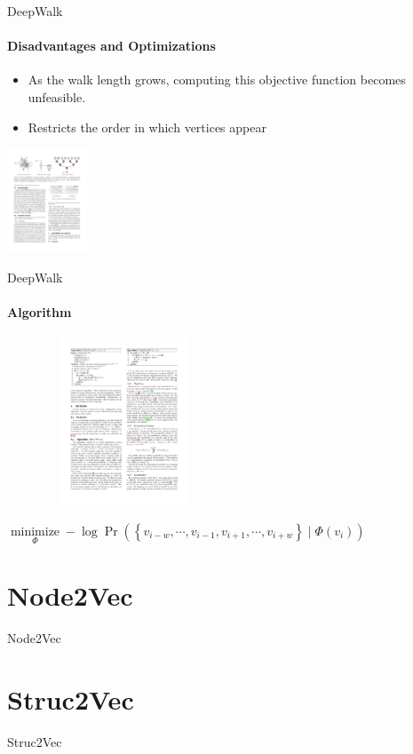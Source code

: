 \documentclass{beamer}
\begin{document}
\begin{frame}{DeepWalk}
    \framesubtitle{Disadvantages and Optimizations}
    \begin{itemize}
        \item As the walk length grows, computing this objective function becomes unfeasible.
        \item Restricts the order in which vertices appear
    \end{itemize}
    \centering\includegraphics[height=3.1cm]{DeepWalk_3.pdf}
\end{frame}
\begin{frame}{DeepWalk}
    \framesubtitle{Algorithm}
    \centering\includegraphics[height=5cm, width=7cm]{DeepWalk_4.pdf}
    \begin{corollary}
        $\underset{\Phi}{\operatorname{minimize}}-\log \operatorname{Pr}\left(\left\{v_{i-w}, \cdots, v_{i-1}, v_{i+1}, \cdots, v_{i+w}\right\} \mid \Phi\left(v_{i}\right)\right)$
    \end{corollary}
\end{frame}
\section{Node2Vec}
\begin{frame}{Node2Vec}
    
\end{frame}
\section{Struc2Vec}
\begin{frame}{Struc2Vec}
    
\end{frame}
\end{document}
